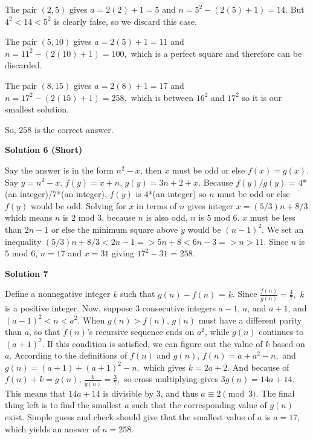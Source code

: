 \begin{enumerate}
 The pair $(2,5)$ gives $a=2(2)+1=5$ and $n=5^2-(2(5)+1)=14.$ But $4^2<14<5^2$ is clearly false, so we discard this case.

 The pair $(5,10)$ gives $a=2(5)+1=11$ and $n=11^2-(2(10)+1)=100,$ which is a perfect square and therefore can be discarded.

 The pair $(8,15)$ gives $a=2(8)+1=17$ and $n=17^2-(2(15)+1)=258,$ which is between $16^2$ and $17^2$ so it is our smallest solution.

 So, $\boxed{258}$ is the correct answer.

 



\textbf{Solution 6 (Short)}

Say the answer is in the form $n^{2}-x$, then $x$ must be odd or else $f(x) = g(x)$. Say $y = n^{2}-x$. $f(y) = x+n$, $g(y) = 3n+2+x$. Because $f(y)/g(y)$ = $4$*(an integer)/$7$*(an integer),  $f(y)$ is $4$*(an integer) so $n$ must be odd or else $f(y)$ would be odd. Solving for $x$ in terms of $n$ gives integer $x = (5/3)n+8/3$ which means $n$ is $2$ mod $3$, because $n$ is also odd, $n$ is $5$ mod $6$. $x$ must be less than $2n-1$ or else the minimum square above $y$ would be $(n-1)^{2}$. We set an inequality $(5/3)n+8/3<2n-1 => 5n+8<6n-3 => n>11$.   Since $n$ is $5$ mod $6$, $n = 17$ and $x = 31$ giving $17^{2}-31$ = $\boxed{258}$.

 



\textbf{Solution 7}

Define a nonnegative integer $k$ such that $g(n)-f(n)$ = $k$. Since $\frac{f(n)}{g(n)} = \frac{4}{7},$ $k$ is a positive integer. Now, suppose 3 consecutive integers $a-1$, $a$, and $a+1$, and $(a-1)^2 < n < a^2$. When $g(n) > f(n)$, $g(n)$ must have a different parity than $a$, so that $f(n)$'s recursive sequence ends on $a^2$, while $g(n)$ continues to $(a+1)^2$. If this condition is satisfied, we can figure out the value of $k$ based on $a$. According to the definitions of $f(n)$ and $g(n)$, $f(n) = a+a^2-n,$ and $g(n) = (a+1)+(a+1)^2-n,$ which gives $k = 2a+2$. And because of $f(n) + k = g(n)$, $\frac{k}{g(n)} = \frac{3}{7},$ so cross multiplying gives $3g(n) = 14a+14$. This means that $14a+14$ is divisible by 3, and thus $a \equiv 2 \pmod{3}$. The final thing left is to find the smallest $a$ such that the corresponding value of $g(n)$ exist. Simple guess and check should give that the smallest value of $a$ is $a = 17$, which yields an answer of $n = \boxed{258}$.

 




\end{enumerate}
